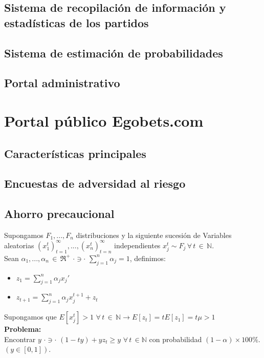 \subsection{Sistema de recopilación de información y estadísticas de los partidos}
\subsection{Sistema de estimación de probabilidades}
\subsection{Portal administrativo}
\section{Portal público Egobets.com}
\subsection{Características principales}
\subsection{Encuestas de adversidad al riesgo}
\subsection{Ahorro precaucional}

Supongamos $F_1,...,F_n$ distribuciones y la siguiente sucesión de Variables aleatorias $(x_1^t)_{t=1}^{\infty},..., (x_n^t)_{t=n}^{\infty}$ independientes $x_j^{t} \sim F_j \,\forall\, t\, \in\, \mathbb{N}$.\\

Sean $\alpha_1,..., \alpha_n\,\in\,\Re^+\,\, \cdot \ni \cdot \,\,\displaystyle \sum_{j=1}^n\alpha_j=1$, definimos:

\begin{itemize}
 \item $z_1=\displaystyle \sum_{j=1}^n\alpha_jx_j'$ 
 \item $z_{t+1}=\displaystyle \sum_{j=1}^n\alpha_jx_j^{t+1}+z_t$ 
\end{itemize}
Supongamos que $E[x_j^t]>1\,\,\forall\,t \,\in\,\mathbb{N}\rightarrow E[z_t]=tE[z_1]=t\mu>1$\\

{\bf Problema:}\\
Encontrar $y \,\,\cdot \ni\cdot\,\,(1-ty)+yz_t \ge y\,\,\forall\,t\,\in \mathbb{N}$ con probabilidad $(1-\alpha)\times 100\%$. $(y\in[0,1])$.

